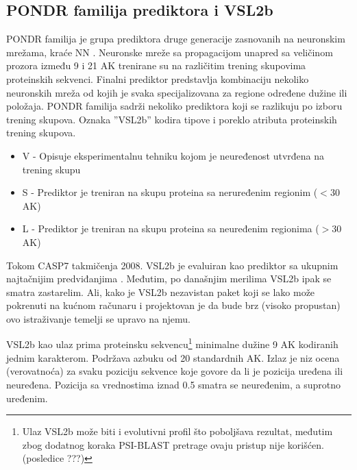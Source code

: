 \subsection{PONDR familija prediktora i VSL2b}
\label{VSL2b}

PONDR familija  je grupa
prediktora druge generacije zasnovanih na neuronskim mrežama, kraće NN .
Neuronske mreže sa propagacijom unapred  sa veličinom
prozora između 9 i 21 AK trenirane su na različitim trening skupovima
proteinskih sekvenci.  Finalni prediktor predstavlja kombinaciju nekoliko
neuronskih mreža od kojih je svaka specijalizovana za regione određene dužine
ili položaja.  PONDR familija sadrži nekoliko prediktora koji  se razlikuju 
po izboru trening skupova.
Oznaka ''VSL2b'' kodira tipove i poreklo atributa proteinskih trening skupova.
\begin{itemize}
  \item V - Opisuje eksperimentalnu tehniku kojom je neuređenost utvrđena na
    trening skupu 
  \item S - Prediktor je treniran na skupu proteina sa 
      neruređenim regionim ($<30$ AK)
  \item L - Prediktor je treniran na skupu proteina sa 
    neuređenim regionima ($>30$ AK)
\end{itemize}

Tokom CASP7 takmičenja 2008. VSL2b je evaluiran kao prediktor sa ukupnim
najtačnijim predviđanjima \parencite{bohe2009}. Međutim, po današnjim merilima
\parencite{meng2017} VSL2b ipak se smatra zastarelim.  Ali, kako je VSL2b
nezavistan paket koji se lako može pokrenuti na kućnom računaru i projektovan
je da bude brz (visoko propustan) ovo istraživanje temelji se upravo na njemu.

VSL2b kao ulaz prima proteinsku sekvencu\footnote{
Ulaz VSL2b može biti i evolutivni profil što poboljšava rezultat,  međutim zbog
dodatnog koraka PSI-BLAST pretrage ovaju pristup nije korišćen.
(posledice ???)
}
minimalne dužine 9 AK kodiranih jednim
karakterom. Podržava azbuku od 20 standardnih AK.  Izlaz je niz
ocena (verovatnoća) za svaku poziciju sekvence
koje govore da li je pozicija uređena ili neuređena. Pozicija sa vrednostima iznad
0.5 smatra se neuređenim, a suprotno uređenim.





